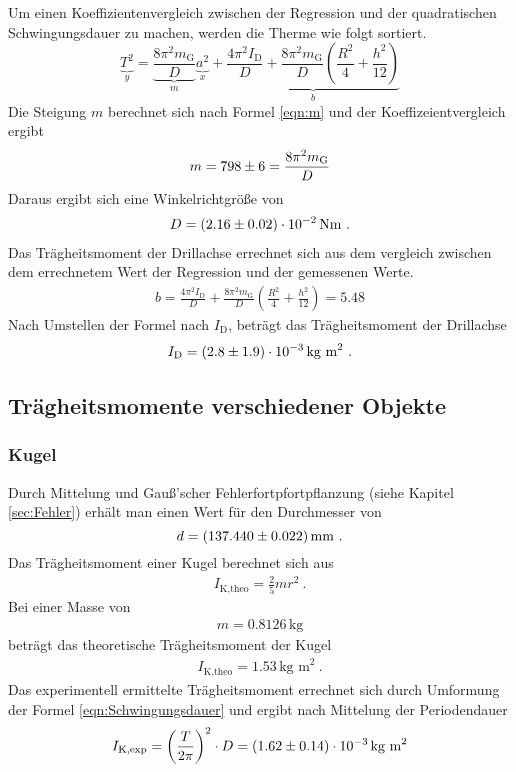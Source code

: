 Um einen Koeffizientenvergleich zwischen der Regression und der quadratischen Schwingungsdauer zu machen, werden die Therme wie folgt sortiert.
\begin{equation}
	\underbrace{T^2}_y = \underbrace{\frac{8 \pi^2 m_\text{G}}{D}}_m \underbrace{a^2}_x + \underbrace{\frac{4 \pi^2 I_\text{D}}{D} + \frac{8\pi^2 m_\text{G}}{D} \left( \frac{R^2}{4} + \frac{h^2}{12} \right)}_b
\end{equation}
Die Steigung $m$ berechnet sich nach Formel \ref{eqn:m} und der Koeffizeientvergleich ergibt
\begin{align}
	m = \num{798 +- 6} = \frac{8 \pi^2 m_\text{G}}{D}
\end{align}
Daraus ergibt sich eine Winkelrichtgröße von
\begin{align}
	D = (\num{2.16 +- 0.02}) \cdot 10^{-2} \, \text{Nm} \ .
\end{align}
Das Trägheitsmoment der Drillachse errechnet sich aus dem vergleich zwischen dem errechnetem Wert der Regression und der gemessenen Werte.
\begin{align}
	b = \frac{4 \pi^2 I_\text{D}}{D} + \frac{8\pi^2 m_\text{G}}{D} \left( \frac{R^2}{4} + \frac{h^2}{12} \right) = 5.48
\end{align}
Nach Umstellen der Formel nach $I_\text{D}$, beträgt das Trägheitsmoment der Drillachse
\begin{align*}
	I_\text{D} = (\num{2.8 +- 1.9}) \cdot 10^{-3} \, \text{kg m}^2 \ .
\end{align*}




\subsection{Trägheitsmomente verschiedener Objekte}
\subsubsection{Kugel}
Durch Mittelung und Gauß'scher Fehlerfortpfortpflanzung (siehe Kapitel \ref{sec:Fehler}) erhält man einen Wert für den Durchmesser von
\begin{equation}
	d = (\num{137.44 +- 0.022}) \, \text{mm} \ .
\end{equation}
Das Trägheitsmoment einer Kugel berechnet sich aus
\begin{align}
	I_\text{K,theo} = \frac{2}{5} mr^2 \ .
\end{align}
Bei einer Masse von
\begin{align*}
	m = 0.8126 \, \text{kg}
\end{align*}
beträgt das theoretische Trägheitsmoment der Kugel
\begin{align}
	I_\text{K,theo} = 1.53 \, \text{kg m}^2 \ .
\end{align}
Das experimentell ermittelte Trägheitsmoment errechnet sich durch Umformung der Formel \ref{eqn:Schwingungsdauer} und ergibt nach Mittelung der Periodendauer
\begin{equation}
	\label{eqn:T_K}
	I_\text{K,exp} = \left( \frac{T}{2 \pi} \right) ^2 \cdot D = (\num{1.62 +- 0.14}) \cdot 10^{-3} \, \text{kg m}^2
\end{equation}

